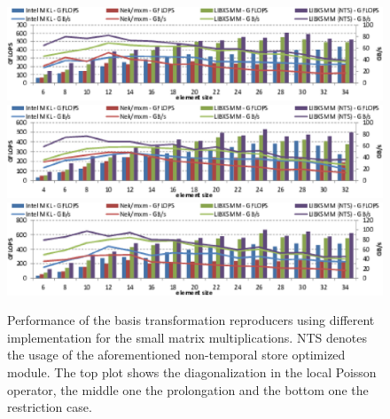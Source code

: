 \begin{figure}[!t]
\centering
\includegraphics[width=1.0\textwidth]{gfx/rstr}   
\includegraphics[width=1.0\textwidth]{gfx/rstr_fwd}
\includegraphics[width=1.0\textwidth]{gfx/rstr_rev}
\caption{Performance of the basis transformation reproducers using different implementation for the 
small matrix multiplications. NTS denotes the usage of the aforementioned non-temporal store optimized module. The top plot
shows the diagonalization in the local Poisson operator, the middle one the prolongation and the bottom one the restriction case.}
\label{fig:rstr}
\end{figure}

%
